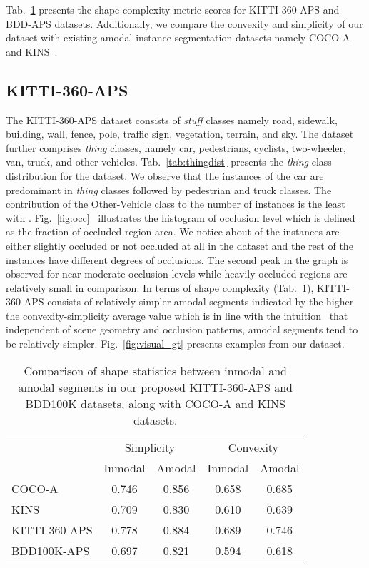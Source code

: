 \documentclass[10pt,twocolumn,letterpaper]{article}
\newcommand{\figref}[1]{Fig.~\ref{#1}}
\newcommand{\tabref}[1]{Tab.~\ref{#1}}
\begin{document}
\tabref{tab:shape} presents the shape complexity metric scores for KITTI-360-APS and BDD-APS datasets. Additionally, we compare the convexity and simplicity of our dataset with existing amodal instance segmentation datasets namely COCO-A~\cite{zhu2017semantic} and KINS~\cite{qi2019amodal}.

\subsection{KITTI-360-APS}

The KITTI-360-APS dataset consists of  \textit{stuff} classes namely road, sidewalk, building, wall, fence, pole, traffic sign, vegetation, terrain, and sky. The dataset further comprises  \textit{thing} classes, namely car, pedestrians, cyclists, two-wheeler, van, truck, and other vehicles. \tabref{tab:thingdist} presents the \textit{thing} class distribution for the dataset. We observe that the instances of the car are predominant in \textit{thing} classes followed by pedestrian and truck classes. The contribution of the Other-Vehicle class to the number of instances is the least with . \figref{fig:occ}~ illustrates the histogram of occlusion level which is defined as the fraction of occluded region area. We notice about  of the instances are either slightly occluded or not occluded at all in the dataset and the rest of the instances have different degrees of occlusions. The second peak in the graph is observed for near moderate occlusion levels while heavily occluded regions are relatively small in comparison. In terms of shape complexity (\tabref{tab:shape}), KITTI-360-APS consists of relatively simpler amodal segments indicated by the higher the convexity-simplicity average value which is in line with the intuition~\cite{zhu2017semantic} that independent of scene geometry and occlusion patterns, amodal segments tend to be relatively simpler. \figref{fig:visual_gt} presents examples from our dataset.

\begin{table}
\centering\small\renewcommand{}
\renewcommand{\tabcolsep}{2mm}
\begin{tabular}{l|cc|cc}
\toprule
 & \multicolumn{2}{c|}{{Simplicity}} & \multicolumn{2}{c}{{Convexity}}\\
\cmidrule{2-5}
 & Inmodal & Amodal & Inmodal & Amodal \\
\midrule
COCO-A~\cite{zhu2017semantic} & 0.746   & 0.856   & 0.658   & 0.685\\
KINS~\cite{qi2019amodal}  & 0.709   & 0.830   & 0.610   & 0.639\\
KITTI-360-APS & 0.778   & 0.884   & 0.689   & 0.746\\
BDD100K-APS  & 0.697   & 0.821   & 0.594   & 0.618\\
\bottomrule
\end{tabular}
\caption{Comparison of shape statistics between inmodal and amodal segments in our proposed KITTI-360-APS and BDD100K datasets, along with COCO-A and KINS datasets.}
\label{tab:shape}
\end{table}
\end{document}
